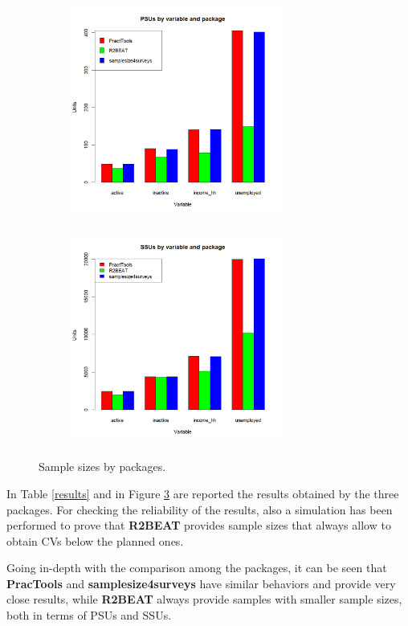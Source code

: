 \begin{figure} [h!]
	\begin{subfigure}
		\centering
		\includegraphics[width=7cm,height=7cm]{comparisonPSU.png}
		\label{comparison:fig1}
	\end{subfigure}
	\begin{subfigure}
		\centering
		\includegraphics[width=7cm,height=7cm]{comparisonSSU.png}
		\label{comparison:fig2}
	\end{subfigure}
	\caption{Sample sizes by packages.}
	\label{comparison}
\end{figure}

In Table \ref{results} and in Figure \ref{comparison} are reported the results obtained by the three packages.
For checking the reliability of the results, also a simulation has been performed to prove that \textbf{R2BEAT} provides sample sizes that always allow to obtain CVs below the planned ones.

Going in-depth with the comparison among the packages, it can be seen that \textbf{PracTools} and \textbf{samplesize4surveys} have similar behaviors and provide very close results, while \textbf{R2BEAT} always provide samples with smaller sample sizes, both in terms of PSUs and SSUs. 

